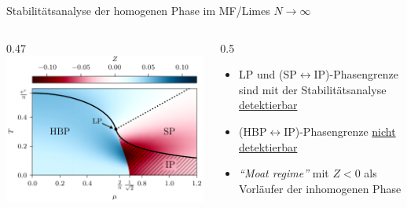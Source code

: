 \documentclass[10pt]{beamer}
\begin{document}
\begin{frame}{Stabilitätsanalyse der homogenen Phase im MF/Limes $N\rightarrow\infty$}
	\hypersetup{linkcolor=goetheBlauDarker} 
	\begin{columns}
		\begin{column}{0.47\framewidth}
			\centering
			\includegraphics[width=0.47\framewidth]{../gn/figures/stab_pd.pdf}
		\end{column}\hspace{.1cm}
		\begin{column}{0.5\framewidth}
			\begin{itemize}
				\item LP und (SP$\leftrightarrow$IP)-Phasengrenze sind mit der Stabilitätsanalyse \hyperlink{2dstab}{detektierbar}
				\item (HBP$\leftrightarrow$IP)-Phasengrenze \hyperlink{2dstab}{nicht detektierbar}
				\item \textit{``Moat regime''} mit $Z<0$ als Vorläufer der inhomogenen Phase
			\end{itemize}
		\end{column}
	\end{columns}

	
\end{frame}
\end{document}

